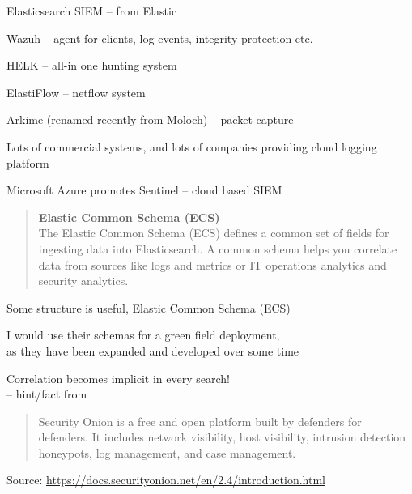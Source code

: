 \documentclass[Screen16to9,17pt]{foils}
\begin{document}
\begin{list2}
\item Elasticsearch SIEM -- from Elastic
\item Wazuh -- agent for clients, log events, integrity protection etc.
\item HELK -- all-in one hunting system
\item ElastiFlow -- netflow system
\item Arkime (renamed recently from Moloch) -- packet capture
\end{list2}

Lots of commercial systems, and lots of companies providing cloud logging platform

Microsoft Azure promotes Sentinel -- cloud based SIEM\\ {\footnotesize
{}}




\begin{quote}{\bf
Elastic Common Schema (ECS)}\\
The Elastic Common Schema (ECS) defines a common set of fields for ingesting data into Elasticsearch. A common schema helps you correlate data from sources like logs and metrics or IT operations analytics and security analytics.
\end{quote}

\begin{list2}

\item Some structure is useful, Elastic Common Schema (ECS)\\
\item I would use their schemas for a green field deployment,\\
  as they have been expanded and developed over some time
\item Correlation becomes implicit in every search!\\
-- hint/fact from {\small{}}
\end{list2}





\begin{quote}
Security Onion is a free and open platform built by defenders for defenders. It includes network visibility, host visibility, intrusion detection honeypots, log management, and case management.
\end{quote}
Source:  \url{https://docs.securityonion.net/en/2.4/introduction.html}
\end{document}
